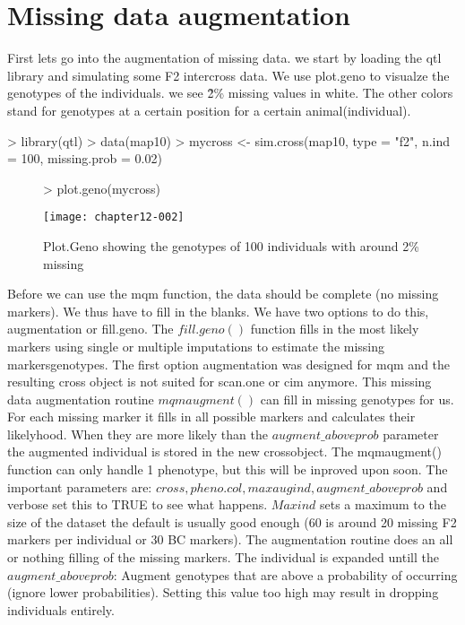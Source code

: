 \documentclass[11pt]{article}
\begin{document}
\section{Missing data augmentation}
First lets go into the augmentation of missing data. we start by loading the qtl library and simulating some F2 intercross data. We use plot.geno to visualze the genotypes of the individuals. we see \~2\% missing values in white. The other colors stand for genotypes at a certain position for a certain animal(individual).
\begin{Schunk}
\begin{Sinput}
> library(qtl)
> data(map10)
> mycross <- sim.cross(map10, type = "f2", n.ind = 100, missing.prob = 0.02)
\end{Sinput}
\end{Schunk}
\begin{figure}[h]
\begin{Schunk}
\begin{Sinput}
> plot.geno(mycross)
\end{Sinput}
\end{Schunk}
\texttt{[image: chapter12-002]}
\caption{Plot.Geno showing the genotypes of 100 individuals with around 2\% missing}
\end{figure}
Before we can use the mqm function, the data should be complete (no missing markers). We thus have to fill in the blanks. We have two options to do this, augmentation or fill.geno. The $fill.geno()$ function fills in the most likely markers using single or multiple imputations
to estimate the missing markersgenotypes. The first option augmentation was designed for mqm and the resulting cross object is not suited for scan.one or cim anymore. This missing data augmentation routine $mqmaugment()$ can fill in missing genotypes for us. For each missing marker it fills in all possible markers and calculates their likelyhood. When they are more likely than the $augment\_aboveprob$ parameter the augmented individual is stored in the new crossobject. The mqmaugment() function can only handle 1 phenotype, but this will be inproved upon soon. The important parameters are:
$cross, pheno.col, maxaugind, augment\_aboveprob$ and verbose set this to TRUE to see what happens. $Maxind$ sets a maximum to the size of the dataset the default is usually good enough (60 is around 20 missing F2 markers per individual or 30 BC markers). The augmentation routine does an all or nothing filling of the missing markers. The individual is expanded untill the $augment\_aboveprob$: Augment genotypes that are above a probability of occurring (ignore lower probabilities). Setting this value too high may result in dropping individuals entirely.
\end{document}
